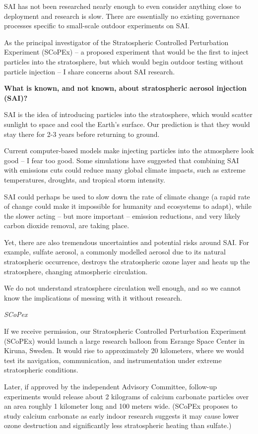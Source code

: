 \documentclass[
]{book}
\begin{document}
SAI has not been researched nearly enough to even consider anything close to deployment and research is slow. There are essentially no existing governance processes specific to small-scale outdoor experiments on SAI.

As the principal investigator of the Stratospheric Controlled Perturbation Experiment (SCoPEx) -- a proposed experiment that would be the first to inject particles into the stratosphere, but which would begin outdoor testing without particle injection -- I share concerns about SAI research.

\textbf{What is known, and not known, about stratospheric aerosol injection (SAI)?}

SAI is the idea of introducing particles into the stratosphere, which would scatter sunlight to space and cool the Earth's surface. Our prediction is that they would stay there for 2-3 years before returning to ground.

Current computer-based models make injecting particles into the atmosphere look good -- I fear too good. Some simulations have suggested that combining SAI with emissions cuts could reduce many global climate impacts, such as extreme temperatures, droughts, and tropical storm intensity.

SAI could perhaps be used to slow down the rate of climate change (a rapid rate of change could make it impossible for humanity and ecosystems to adapt), while the slower acting -- but more important -- emission reductions, and very likely carbon dioxide removal, are taking place.

Yet, there are also tremendous uncertainties and potential risks around SAI. For example, sulfate aerosol, a commonly modelled aerosol due to its natural stratospheric occurrence, destroys the stratospheric ozone layer and heats up the stratosphere, changing atmospheric circulation.

We do not understand stratosphere circulation well enough, and so we cannot know the implications of messing with it without research.

\emph{SCoPex}

If we receive permission, our Stratospheric Controlled Perturbation Experiment (SCoPEx) would launch a large research balloon from Esrange Space Center in Kiruna, Sweden. It would rise to approximately 20 kilometers, where we would test its navigation, communication, and instrumentation under extreme stratospheric conditions.

Later, if approved by the independent Advisory Committee, follow-up experiments would release about 2 kilograms of calcium carbonate particles over an area roughly 1 kilometer long and 100 meters wide. (SCoPEx proposes to study calcium carbonate as early indoor research suggests it may cause lower ozone destruction and significantly less stratospheric heating than sulfate.)
\end{document}
